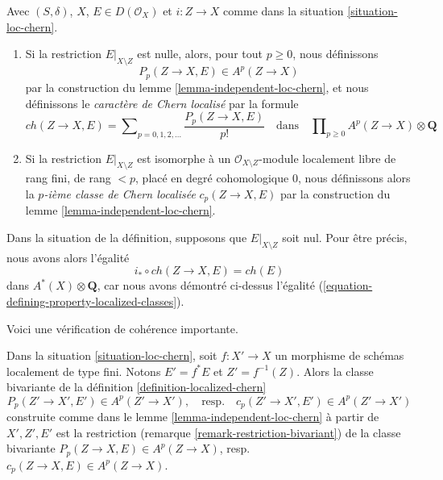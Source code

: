 \begin{definition}
\label{definition-localized-chern}
Avec $(S, \delta)$, $X$, $E \in D(\mathcal{O}_X)$ et $i : Z \to X$ comme dans la
situation \ref{situation-loc-chern}.
\begin{enumerate}
\item Si la restriction $E|_{X \setminus Z}$ est nulle, alors, pour tout
$p \geq 0$, nous définissons
$$
P_p(Z \to X, E) \in A^p(Z \to X)
$$
par la construction du lemme \ref{lemma-independent-loc-chern},
et nous définissons le {\it caractère de Chern localisé} par la formule
$$
ch(Z \to X, E) =
\sum\nolimits_{p = 0, 1, 2, \ldots} \frac{P_p(Z \to X, E)}{p!}
\quad\text{dans}\quad \prod\nolimits_{p \geq 0} A^p(Z \to X) \otimes \mathbf{Q}
$$
\item Si la restriction $E|_{X \setminus Z}$ est isomorphe à un
$\mathcal{O}_{X \setminus Z}$-module localement libre de rang fini, de rang $< p$,
placé en degré cohomologique $0$, nous définissons alors la
{\it $p$-ième classe de Chern localisée} $c_p(Z \to X, E)$ par la construction
du lemme \ref{lemma-independent-loc-chern}.
\end{enumerate}
\end{definition}

\noindent
Dans la situation de la définition, supposons que $E|_{X \setminus Z}$ soit nul.
Pour être précis, nous avons alors l'égalité
$$
i_* \circ ch(Z \to X, E) = ch(E)
$$
dans $A^*(X) \otimes \mathbf{Q}$, car nous avons démontré ci-dessus
l'égalité (\ref{equation-defining-property-localized-classes}).

\medskip\noindent
Voici une vérification de cohérence importante.

\begin{lemma}
\label{lemma-base-change-loc-chern}
Dans la situation \ref{situation-loc-chern},
soit $f : X' \to X$ un morphisme de schémas localement de type fini.
Notons $E' = f^*E$ et $Z' = f^{-1}(Z)$. Alors la classe bivariante
de la définition \ref{definition-localized-chern}
$$
P_p(Z' \to X', E') \in A^p(Z' \to X'),
\quad\text{resp.}\quad
c_p(Z' \to X', E') \in A^p(Z' \to X')
$$
construite comme dans le lemme \ref{lemma-independent-loc-chern}
à partir de $X', Z', E'$ est la restriction
(remarque \ref{remark-restriction-bivariant}) de la
classe bivariante $P_p(Z \to X, E) \in A^p(Z \to X)$,
resp.\ $c_p(Z \to X, E) \in A^p(Z \to X)$.
\end{lemma}

